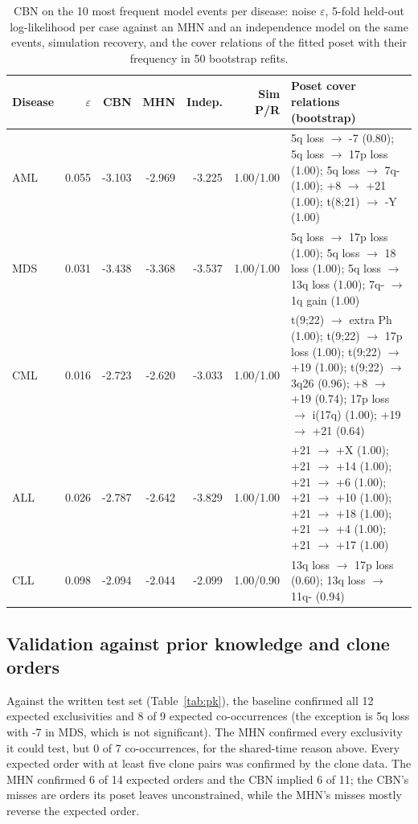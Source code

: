 \documentclass[conference]{IEEEtran}
\begin{document}
\begin{table}[!t]
\centering
\caption{CBN on the 10 most frequent model events per disease: noise $\varepsilon$, 5-fold held-out log-likelihood per case against an MHN and an independence model on the same events, simulation recovery, and the cover relations of the fitted poset with their frequency in 50 bootstrap refits.}
\label{tab:cbn}
\footnotesize
\setlength{\tabcolsep}{3pt}
\begin{tabular}{lrrrrrp{8.2cm}}
\toprule
\textbf{Disease} & \textbf{$\varepsilon$} & \textbf{CBN} & \textbf{MHN} & \textbf{Indep.} & \textbf{Sim P/R} & \textbf{Poset cover relations (bootstrap)} \\
\midrule
AML & 0.055 & -3.103 & -2.969 & -3.225 & 1.00/1.00 & 5q loss $\rightarrow$ -7 (0.80); 5q loss $\rightarrow$ 17p loss (1.00); 5q loss $\rightarrow$ 7q- (1.00); +8 $\rightarrow$ +21 (1.00); t(8;21) $\rightarrow$ -Y (1.00) \\
MDS & 0.031 & -3.438 & -3.368 & -3.537 & 1.00/1.00 & 5q loss $\rightarrow$ 17p loss (1.00); 5q loss $\rightarrow$ 18 loss (1.00); 5q loss $\rightarrow$ 13q loss (1.00); 7q- $\rightarrow$ 1q gain (1.00) \\
CML & 0.016 & -2.723 & -2.620 & -3.033 & 1.00/1.00 & t(9;22) $\rightarrow$ extra Ph (1.00); t(9;22) $\rightarrow$ 17p loss (1.00); t(9;22) $\rightarrow$ +19 (1.00); t(9;22) $\rightarrow$ 3q26 (0.96); +8 $\rightarrow$ +19 (0.74); 17p loss $\rightarrow$ i(17q) (1.00); +19 $\rightarrow$ +21 (0.64) \\
ALL & 0.026 & -2.787 & -2.642 & -3.829 & 1.00/1.00 & +21 $\rightarrow$ +X (1.00); +21 $\rightarrow$ +14 (1.00); +21 $\rightarrow$ +6 (1.00); +21 $\rightarrow$ +10 (1.00); +21 $\rightarrow$ +18 (1.00); +21 $\rightarrow$ +4 (1.00); +21 $\rightarrow$ +17 (1.00) \\
CLL & 0.098 & -2.094 & -2.044 & -2.099 & 1.00/0.90 & 13q loss $\rightarrow$ 17p loss (0.60); 13q loss $\rightarrow$ 11q- (0.94) \\
\bottomrule
\end{tabular}
\end{table}
\subsection{Validation against prior knowledge and clone orders}
Against the written test set (Table~\ref{tab:pk}), the baseline confirmed all 12 expected exclusivities and 8 of 9 expected co-occurrences (the exception is 5q loss with -7 in MDS, which is not significant). The MHN confirmed every exclusivity it could test, but 0 of 7 co-occurrences, for the shared-time reason above. Every expected order with at least five clone pairs was confirmed by the clone data. The MHN confirmed 6 of 14 expected orders and the CBN implied 6 of 11; the CBN's misses are orders its poset leaves unconstrained, while the MHN's misses mostly reverse the expected order.
\end{document}
